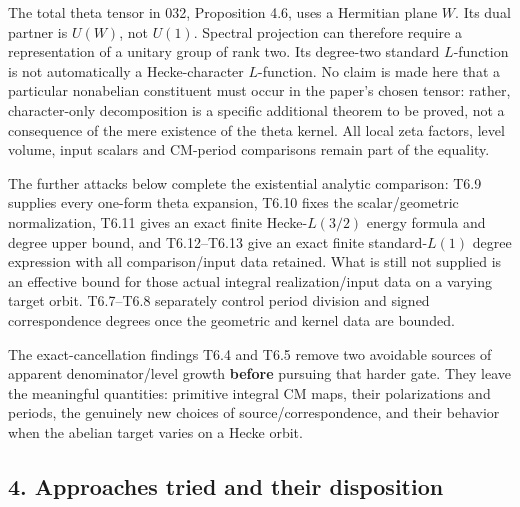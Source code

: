\documentclass[11pt,a4paper]{article}
\theoremstyle{definition}
\begin{document}
The total theta tensor in 032, Proposition 4.6, uses a Hermitian plane \(W\). Its dual partner is \(U(W)\), not \(U(1)\). Spectral projection can therefore require a representation of a unitary group of rank two. Its degree-two standard \(L\)-function is not automatically a Hecke-character \(L\)-function. No claim is made here that a particular nonabelian constituent must occur in the paper's chosen tensor: rather, character-only decomposition is a specific additional theorem to be proved, not a consequence of the mere existence of the theta kernel. All local zeta factors, level volume, input scalars and CM-period comparisons remain part of the equality.

The further attacks below complete the existential analytic comparison: T6.9 supplies every one-form theta expansion, T6.10 fixes the scalar/geometric normalization, T6.11 gives an exact finite Hecke-\(L(3/2)\) energy formula and degree upper bound, and T6.12--T6.13 give an exact finite standard-\(L(1)\) degree expression with all comparison/input data retained. What is still not supplied is an effective bound for those actual integral realization/input data on a varying target orbit. T6.7--T6.8 separately control period division and signed correspondence degrees once the geometric and kernel data are bounded.

The exact-cancellation findings T6.4 and T6.5 remove two avoidable sources of apparent denominator/level growth \textbf{before} pursuing that harder gate. They leave the meaningful quantities: primitive integral CM maps, their polarizations and periods, the genuinely new choices of source/correspondence, and their behavior when the abelian target varies on a Hecke orbit.

\subsection{4. Approaches tried and their disposition}\label{approaches-tried-and-their-disposition}
\end{document}
